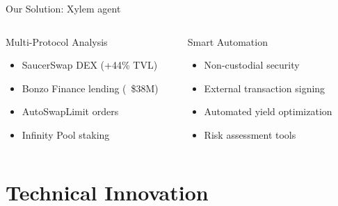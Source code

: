 \documentclass[aspectratio=169]{beamer}
\providecommand{\faShieldAlt}{\faLock}
\begin{document}
\begin{frame}{Our Solution: Xylem agent}
\begin{columns}[c]
\begin{block}{Multi-Protocol Analysis}
\vspace{0.05cm}
\begin{itemize}
\setlength\itemsep{-0.1em}
\setlength\leftmargin{1em}
\item[\color{success}\faCheckCircle] SaucerSwap DEX (+44\% TVL)
\item[\color{success}\faCheckCircle] Bonzo Finance lending (~\$38M)
\item[\color{success}\faCheckCircle] AutoSwapLimit orders
\item[\color{success}\faCheckCircle] Infinity Pool staking
\end{itemize}
\vspace{0.05cm}
\end{block}

\begin{center}
\end{center}

\vspace{0.05cm}

\begin{block}{Smart Automation}
\vspace{0.05cm}
\begin{itemize}
\setlength\itemsep{-0.1em}
\setlength\leftmargin{1em}
\item[\color{primary}\faLock] Non-custodial security
\item[\color{primary}\faSignature] External transaction signing
\item[\color{primary}\faChartPie] Automated yield optimization
\item[\color{primary}\faUserShield] Risk assessment tools
\end{itemize}
\vspace{0.05cm}
\end{block}
\end{columns}
\end{frame}

\section{Technical Innovation}
\end{document}
